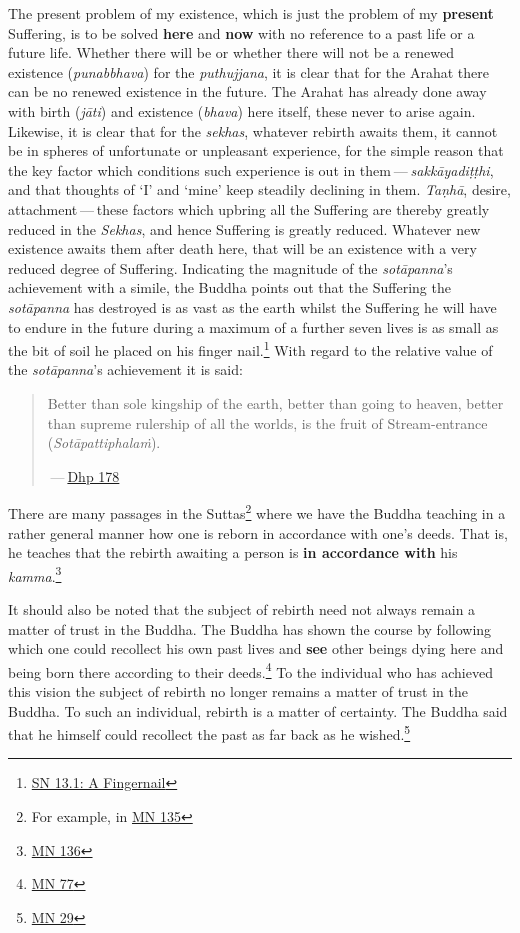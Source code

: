 The present problem of my existence, which is just the problem of my \textbf{present} Suffering, is to be solved \textbf{here} and \textbf{now} with no reference to a past life or a future life. Whether there will be or whether there will not be a renewed existence (\emph{punabbhava}) for the \emph{puthujjana}, it is clear that for the Arahat there can be no renewed existence in the future. The Arahat has already done away with birth (\emph{jāti}) and existence (\emph{bhava}) here itself, these never to arise again. Likewise, it is clear that for the \emph{sekhas}, whatever rebirth awaits them, it cannot be in spheres of unfortunate or unpleasant experience, for the simple reason that the key factor which conditions such experience is out in them --- \emph{sakkāyadiṭṭhi}, and that thoughts of `I' and `mine' keep steadily declining in them. \emph{Taṇhā}, desire, attachment --- these factors which upbring all the Suffering are thereby greatly reduced in the \emph{Sekhas}, and hence Suffering is greatly reduced. Whatever new existence awaits them after death here, that will be an existence with a very reduced degree of Suffering. Indicating the magnitude of the \emph{sotāpanna}'s achievement with a simile, the Buddha points out that the Suffering the \emph{sotāpanna} has destroyed is as vast as the earth whilst the Suffering he will have to endure in the future during a maximum of a further seven lives is as small as the bit of soil he placed on his finger nail.\footnote{\href{https://suttacentral.net/sn13.1/en/sujato}{SN 13.1: A Fingernail}} With regard to the relative value of the \emph{sotāpanna}'s achievement it is said:

\begin{quote}
Better than sole kingship of the earth, better than going to heaven, better than supreme rulership of all the worlds, is the fruit of Stream-entrance (\emph{Sotāpattiphalaṁ}).

 --- \href{https://suttacentral.net/dhp167-178/en/sujato}{Dhp 178}
\end{quote}

There are many passages in the Suttas\footnote{For example, in \href{https://suttacentral.net/mn135/en/bodhi}{MN 135}} where we have the Buddha teaching in a rather general manner how one is reborn in accordance with one's deeds. That is, he teaches that the rebirth awaiting a person is \textbf{in accordance with} his \emph{kamma}.\footnote{\href{https://suttacentral.net/mn136/en/thanissaro}{MN 136}}

It should also be noted that the subject of rebirth need not always remain a matter of trust in the Buddha. The Buddha has shown the course by following which one could recollect his own past lives and \textbf{see} other beings dying here and being born there according to their deeds.\footnote{\href{https://suttacentral.net/mn77/en/bodhi}{MN 77}} To the individual who has achieved this vision the subject of rebirth no longer remains a matter of trust in the Buddha. To such an individual, rebirth is a matter of certainty. The Buddha said that he himself could recollect the past as far back as he wished.\footnote{\href{https://suttacentral.net/mn29/en/bodhi}{MN 29}}

